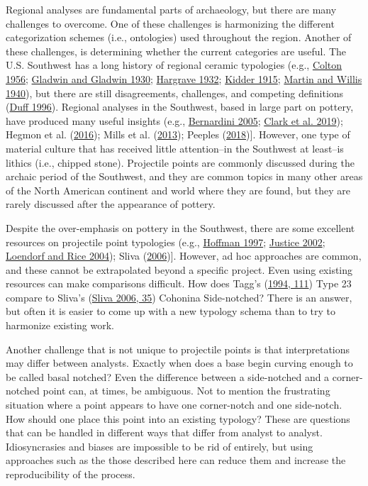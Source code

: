 \documentclass{article}
\begin{document}
Regional analyses are fundamental parts of archaeology, but there are
many challenges to overcome. One of these challenges is harmonizing the
different categorization schemes (i.e., ontologies) used throughout the
region. Another of these challenges, is determining whether the current
categories are useful. The U.S. Southwest has a long history of regional
ceramic typologies (e.g., \protect\hyperlink{ref-Colton1956-zy}{Colton
1956}; \protect\hyperlink{ref-gladwin1930a}{Gladwin and Gladwin 1930};
\protect\hyperlink{ref-Hargrave1932-ng}{Hargrave 1932};
\protect\hyperlink{ref-Kidder1915-ae}{Kidder 1915};
\protect\hyperlink{ref-Martin1940-jg}{Martin and Willis 1940}), but
there are still disagreements, challenges, and competing definitions
(\protect\hyperlink{ref-Duff1996-au}{Duff 1996}). Regional analyses in
the Southwest, based in large part on pottery, have produced many useful
insights (e.g., \protect\hyperlink{ref-Bernardini2005-ue}{Bernardini
2005}; \protect\hyperlink{ref-Clark2019-bz}{Clark et al. 2019}); Hegmon
et al. (\protect\hyperlink{ref-Hegmon2016-xw}{2016}); Mills et al.
(\protect\hyperlink{ref-Mills2013-wq}{2013}); Peeples
(\protect\hyperlink{ref-Peeples2018-ib}{2018}){]}. However, one type of
material culture that has received little attention--in the Southwest at
least--is lithics (i.e., chipped stone). Projectile points are commonly
discussed during the archaic period of the Southwest, and they are
common topics in many other areas of the North American continent and
world where they are found, but they are rarely discussed after the
appearance of pottery.

Despite the over-emphasis on pottery in the Southwest, there are some
excellent resources on projectile point typologies (e.g.,
\protect\hyperlink{ref-Hoffman1997-hb}{Hoffman 1997};
\protect\hyperlink{ref-Justice2002-cf}{Justice 2002};
\protect\hyperlink{ref-Loendorf2004-tp}{Loendorf and Rice 2004}); Sliva
(\protect\hyperlink{ref-Sliva2006-nq}{2006}){]}. However, ad hoc
approaches are common, and these cannot be extrapolated beyond a
specific project. Even using existing resources can make comparisons
difficult. How does Tagg's (\protect\hyperlink{ref-Tagg1994-wi}{1994,
111}) Type 23 compare to Sliva's
(\protect\hyperlink{ref-Sliva2006-nq}{Sliva 2006, 35}) Cohonina
Side-notched? There is an answer, but often it is easier to come up with
a new typology schema than to try to harmonize existing work.

Another challenge that is not unique to projectile points is that
interpretations may differ between analysts. Exactly when does a base
begin curving enough to be called basal notched? Even the difference
between a side-notched and a corner-notched point can, at times, be
ambiguous. Not to mention the frustrating situation where a point
appears to have one corner-notch and one side-notch. How should one
place this point into an existing typology? These are questions that can
be handled in different ways that differ from analyst to analyst.
Idiosyncrasies and biases are impossible to be rid of entirely, but
using approaches such as the those described here can reduce them and
increase the reproducibility of the process.
\end{document}
